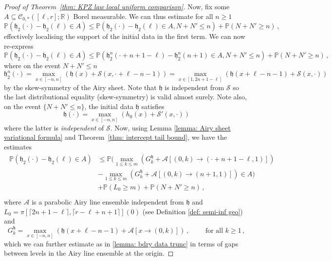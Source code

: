 \documentclass[11pt, reqno]{amsart}
\numberwithin{equation}{section}
\newcommand{\R}{\ensuremath{\mathbb{R}}}
\newcommand{\PP}{\ensuremath{\mathbb{P}}}
\newcommand{\ceil}[1]{\lceil #1 \rceil}
\begin{document}
\begin{proof}[Proof of Theorem~\ref{thm: KPZ law local uniform comparison}]
Now, fix some $A\subseteq \mathscr{C}_{0,*}([\ell, r];\R)$ Borel measurable. We can thus estimate for all $n\ge 1$
\begin{equation*}
\PP(\mathfrak{h}_2(\cdot)-\mathfrak{h}_2(\ell)\in A)\le \PP(\mathfrak{h}_2(\cdot)-\mathfrak{h}_2(\ell)\in A, N+N'\le n)+\PP(N+N'\ge n)\,,
\end{equation*}
effectively localising the support of the initial data in the first term. We can now re-express
\begin{equation*}
\PP(\mathfrak{h}_2(\cdot)-\mathfrak{h}_2(\ell)\in A)\le \PP(\mathfrak{h}^n_2(\cdot+n+1-\ell)-\mathfrak{h}^n_2(n+1)\in A, N+N'\le n)+\PP(N+N'\ge n)\,,
\end{equation*}
where on the event $N+N'\le n$
\begin{equation*}
\mathfrak{h}^n_2(\cdot) = \displaystyle\max_{x\in [-n, n]}(\mathfrak{h}(x) + \mathcal{S}(x,\cdot+\ell-n-1))  = \displaystyle\max_{x\in [1,2n+1-\ell]}(\mathfrak{h}(x+\ell-n-1) + \mathcal{S}(x,\cdot))
\end{equation*}
by the skew-symmetry of the Airy sheet. Note that $\mathfrak{h}$ is independent from $\mathcal{S}$ so the last distributional equality (skew-symmetry) is valid almost surely. Note also, on the event $\{N+N'\le n\}$, the initial data $\mathfrak{h}$ satisfies 
\begin{equation*}
\mathfrak{h}(\cdot) = \displaystyle\max_{x\in [-n, n]}(h_0(x) + \mathcal{S}'(x,\cdot))
\end{equation*}
where the latter is \emph{independent} of $\mathcal{S}$. Now, using Lemma \ref{lemma: Airy sheet variational formula} and Theorem~\ref{thm: intercept tail bound}, we have the estimates
\begin{align*}
    \begin{array}{ll}
         \PP(\mathfrak{h}_2(\cdot)-\mathfrak{h}_2(\ell)\in A)&\le \PP(\displaystyle\max_{1\le k \le m} (G^{\mathfrak{h}}_k+\mathcal{A}[(0,k)\to (\cdot+n+1-\ell, 1)])\\
         &-\displaystyle\max_{1\le k \le m} (G^{\mathfrak{h}}_k+\mathcal{A}[(0,k)\to (n+1, 1)])\in A)\\
         &+\PP(L_0\ge m) + \PP(N+N'\ge n)\,, \\
    \end{array}
\end{align*}
where $\mathcal{A}$ is a parabolic Airy line ensemble independent from $\mathfrak{h}$ and $L_0 = \pi[\ceil{2n+1-\ell}, \ceil{r-\ell+n+1}](0)$ (see Definition \ref{def: semi-inf geo}) and
\begin{equation*}
G^{\mathfrak{h}}_k = \displaystyle\max_{x\in [-n,n]}(\mathfrak{h}(x+\ell-n-1) + \mathcal{A}[x\to (0,k)])\,,\qquad \text{ for all } k\ge 1\,,
\end{equation*}
which we can further estimate as in \eqref{lemma: bdry data trunc} in terms of gaps between levels in the Airy line ensemble at the origin.


\end{proof}
\end{document}
